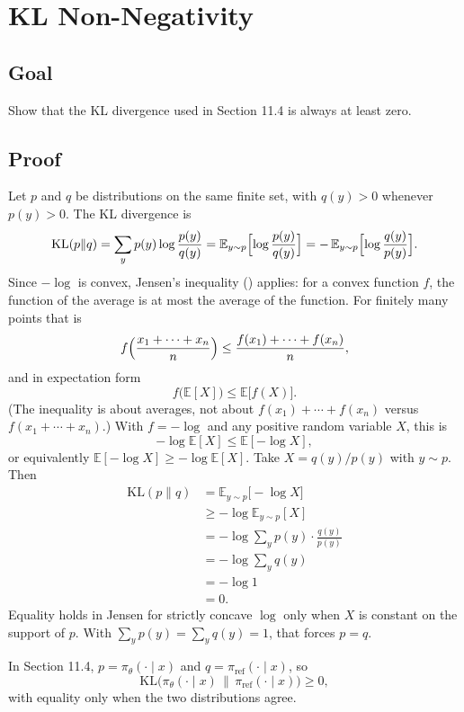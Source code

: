 \chapter{KL Non-Negativity}\label{app:F}

\section*{Goal}

Show that the KL divergence used in Section 11.4 is always at least zero.

\section{Proof}

Let $p$ and $q$ be distributions on the same finite set, with $q(y)>0$ whenever $p(y)>0$. The KL divergence is \[
\mathrm{KL}(p\|q)
=
\sum_y p(y)\log\frac{p(y)}{q(y)}
=
\mathbb{E}_{y\sim p}\Bigl[\log\frac{p(y)}{q(y)}\Bigr]
=
-\,\mathbb{E}_{y\sim p}\Bigl[\log\frac{q(y)}{p(y)}\Bigr].
\] Since $-\log$ is convex, Jensen's inequality () applies: for a convex function $f$, the function of the average is at most the average of the function. For finitely many points that is \[
f\Bigl(\frac{x_1+\cdots+x_n}{n}\Bigr)
\le
\frac{f(x_1)+\cdots+f(x_n)}{n},
\] and in expectation form \[
f\bigl(\mathbb{E}[X]\bigr)\le\mathbb{E}\bigl[f(X)\bigr].
\] (The inequality is about averages, not about $f(x_1)+\cdots+f(x_n)$ versus $f(x_1+\cdots+x_n)$.) With $f=-\log$ and any positive random variable $X$, this is \[
-\log\mathbb{E}[X]\le\mathbb{E}[-\log X],
\] or equivalently $\mathbb{E}[-\log X]\ge-\log\mathbb{E}[X]$. Take $X=q(y)/p(y)$ with $y\sim p$. Then \begin{equation}
\begin{aligned}
\mathrm{KL}(p\|q)
&=
\mathbb{E}_{y\sim p}\bigl[-\log X\bigr]
\\
&\ge
-\log\mathbb{E}_{y\sim p}[X]
\\
&=
-\log\sum_y p(y)\cdot\frac{q(y)}{p(y)}
\\
&=
-\log\sum_y q(y)
\\
&=
-\log 1
\\
&=
0.
\end{aligned}
\tag{F.1}
\end{equation} Equality holds in Jensen for strictly concave $\log$ only when $X$ is constant on the support of $p$. With $\sum_y p(y)=\sum_y q(y)=1$, that forces $p=q$.

In Section 11.4, $p=\pi_\theta(\cdot\mid x)$ and $q=\pi_{\text{ref}}(\cdot\mid x)$, so \[
\mathrm{KL}\bigl(\pi_\theta(\cdot\mid x)\,\|\,\pi_{\text{ref}}(\cdot\mid x)\bigr)\ge 0,
\] with equality only when the two distributions agree.


